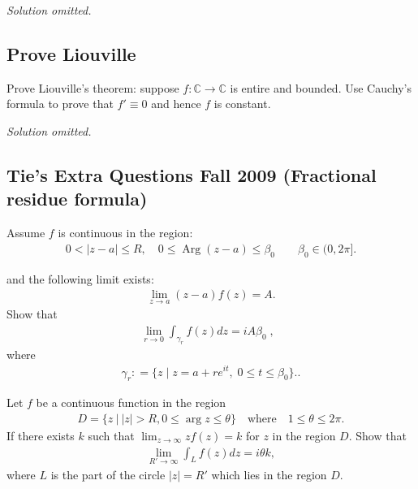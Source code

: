\emph{Solution omitted.}

\hypertarget{prove-liouville}{%
\subsection{Prove Liouville}\label{prove-liouville}}

\begin{problem}[?]

Prove Liouville's theorem: suppose \(f:{\mathbb{C}}\to{\mathbb{C}}\) is
entire and bounded. Use Cauchy's formula to prove that \(f'\equiv 0\)
and hence \(f\) is constant.

\end{problem}

\emph{Solution omitted.}

\hypertarget{ties-extra-questions-fall-2009-fractional-residue-formula}{%
\subsection{Tie's Extra Questions Fall 2009 (Fractional residue
formula)}\label{ties-extra-questions-fall-2009-fractional-residue-formula}}

\begin{problem}[?]

Assume \(f\) is continuous in the region:
\begin{align*}
0 < {\left\lvert {z-a} \right\rvert} \leq R,\quad 0 \leq \operatorname{Arg}(z-a) \leq \beta_0 \qquad \beta_0\in (0, 2\pi]
.\end{align*}

and the following limit exists:
\begin{align*}
\lim_{z\to a}(z-a)f(z) = A
.\end{align*}
Show that
\begin{align*}\lim_{r \rightarrow 0} \int_{\gamma_r} f(z) dz  = i A \beta_0 \; , \; \;\end{align*}
where
\begin{align*}
\gamma_r : = \{ z \; | \; z = a + r e^{it}, \; 0 \leq  t \leq \beta_0 \}.
.\end{align*}

\end{problem}

\begin{problem}

Let \(f\) be a continuous function in the region
\begin{align*}
D=\{z {~\mathrel{\Big\vert}~}{\left\lvert {z} \right\rvert}>R, 0\leq \arg z\leq \theta\}\quad\text{where}\quad 1\leq \theta \leq 2\pi
.\end{align*}
If there exists \(k\) such that
\(\displaystyle{\lim_{z\to\infty} zf(z)=k}\) for \(z\) in the region
\(D\). Show that
\begin{align*}
\lim_{R'\to\infty} \int_{L} f(z) dz=i\theta k
,\end{align*}
where \(L\) is the part of the circle \(|z|=R'\) which lies in the
region \(D\).

\end{problem}

